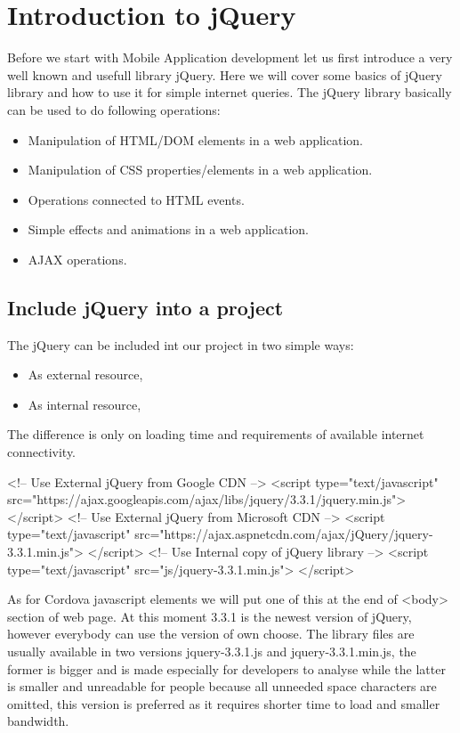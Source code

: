 \chapter{Introduction to jQuery }

Before we start with Mobile Application development let us first introduce a very well known and usefull library jQuery. Here we will cover some basics of jQuery library and how to use it for simple internet queries. The jQuery library basically can be used to do following operations:
\begin{itemize}
\item Manipulation of HTML/DOM elements in a web application.
\item Manipulation of CSS properties/elements in a web application.
\item Operations connected to HTML events.
\item Simple effects and animations in a web application.
\item AJAX operations.
\end{itemize}



\section{Include jQuery into a project}
The jQuery can be included int our project in two simple ways:
\begin{itemize}
\item As external resource,
\item As internal resource,
\end{itemize}

The difference is only on loading time and requirements of available internet connectivity.
\begin{html}
<!-- Use External jQuery from Google CDN -->
<script type="text/javascript"
    src="https://ajax.googleapis.com/ajax/libs/jquery/3.3.1/jquery.min.js">
</script>
<!-- Use External jQuery from Microsoft CDN -->
<script type="text/javascript"
    src="https://ajax.aspnetcdn.com/ajax/jQuery/jquery-3.3.1.min.js">
</script>
<!-- Use Internal copy of jQuery library -->
<script type="text/javascript"
    src="js/jquery-3.3.1.min.js">
</script>
\end{html}
As for Cordova javascript elements we will put one of this at the end of <body> section of web page. At this moment 3.3.1 is the newest version of jQuery, however everybody can use the version of own choose. The library files are usually available in two versions jquery-3.3.1.js and jquery-3.3.1.min.js, the former is bigger and is made especially for developers to analyse while the latter is smaller and unreadable for people because all unneeded space characters are omitted, this version is preferred as it requires shorter time to load and smaller bandwidth.

